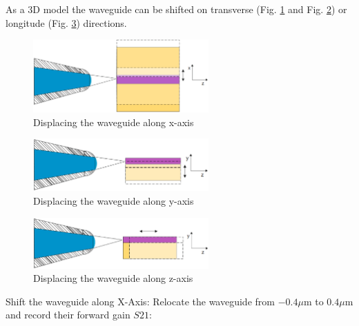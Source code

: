 As a 3D model the waveguide can be shifted on transverse (Fig. \ref{fig:shift_x_axis} and Fig. \ref{fig:shift_y_axis}) or longitude (Fig. \ref{fig:shift_z_axis})  directions.
\begin{figure}[!ht]
\centering
\includegraphics[width=0.6\textwidth]{bilder/shift_x_axis}
\caption{Displacing the waveguide along x-axis}
\label{fig:shift_x_axis}
\end{figure}
\begin{figure}[!ht]
\centering
\includegraphics[width=0.6\textwidth]{bilder/shift_y_axis}
\caption{Displacing the waveguide along y-axis}
\label{fig:shift_y_axis}
\end{figure}
\begin{figure}[!ht]
\centering
\includegraphics[width=0.6\textwidth]{bilder/shift_z_axis}
\caption{Displacing the waveguide along z-axis}
\label{fig:shift_z_axis}
\end{figure}
Shift the waveguide along X-Axis: Relocate the waveguide from $-0.4\mu$m to $0.4\mu$m and record their forward gain $S21$:
%
%


